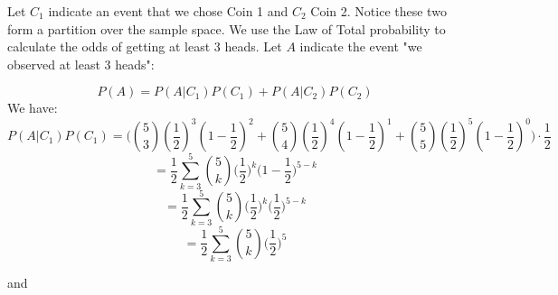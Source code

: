 \documentclass{article}
\begin{document}
Let \(C_1\) indicate an event that we chose Coin 1 and \(C_2\) Coin 2. Notice
these two form a partition over the sample space. We use the Law of Total probability
to calculate the odds of getting at least 3 heads. Let \(A\) indicate the event "we observed
at least 3 heads":

\begin{equation*}
    P(A) = P(A|C_1)P(C_1) + P(A|C_2)P(C_2)
\end{equation*}
We have:
\begin{equation*}
    P(A|C_1)P(C_1) = 
        \Bigg(\binom{5}{3}(\frac{1}{2})^{3}(1 - \frac{1}{2})^{2} + 
        \binom{5}{4}(\frac{1}{2})^{4}(1 - \frac{1}{2})^{1} + 
        \binom{5}{5}(\frac{1}{2})^{5}(1 - \frac{1}{2})^{0}\Bigg) \cdot 
        \frac{1}{2}
\end{equation*}
\begin{equation*}
    = \frac{1}{2}\sum_{k=3}^{5}\binom{5}{k}\Big(\frac{1}{2}\Big)^{k}\Big(1 - \frac{1}{2}\Big)^{5 - k}
\end{equation*}
\begin{equation*}
    = \frac{1}{2}\sum_{k=3}^{5}\binom{5}{k}\Big(\frac{1}{2}\Big)^{k}\Big(\frac{1}{2}\Big)^{5 - k}
\end{equation*}
\begin{equation*}
    = \frac{1}{2}\sum_{k=3}^{5}\binom{5}{k}\Big(\frac{1}{2}\Big)^{5}
\end{equation*}

and
\end{document}
